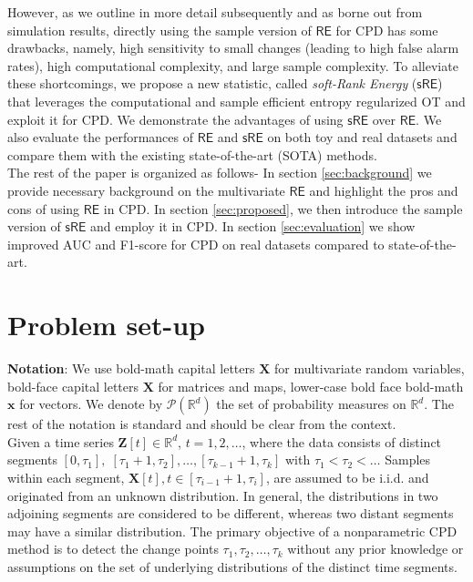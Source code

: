 \documentclass{article}
\begin{document}
However, as we outline in more detail subsequently and as borne out from simulation results, directly using the sample version of {\small $\mathsf{RE}$} for CPD has some drawbacks, namely, high sensitivity to small changes (leading to high false alarm rates), high computational complexity, and large sample complexity. To alleviate these  shortcomings, we propose a new statistic, called \textit{soft-Rank Energy} ({\small $\mathsf{sRE}$}) that leverages the computational and sample efficient entropy regularized OT \cite{peyre2019computational} and exploit it for CPD. We demonstrate the advantages of using {\small $\mathsf{sRE}$} over {\small $\mathsf{RE}$}. We also evaluate the performances of {\small $\mathsf{RE}$} and {\small $\mathsf{sRE}$} on both toy and real datasets and compare them with the existing state-of-the-art (SOTA) methods. \\ 

The rest of the paper is organized as follows- In section \ref{sec:background} we provide necessary background on the multivariate {\small $\mathsf{RE}$} and highlight the pros and cons of using {\small $\mathsf{RE}$} in CPD. In section \ref{sec:proposed}, we then introduce the sample version of {\small $\mathsf{sRE}$} and employ it in CPD. In section \ref{sec:evaluation} we show improved AUC and F1-score for CPD on real datasets compared to state-of-the-art.

\section{Problem set-up}

\textbf{Notation}: We use bold-math capital letters $\bm{X}$ for multivariate random variables, bold-face capital letters $\mathbf{X}$ for matrices and maps, lower-case bold face bold-math $\bm{x}$ for vectors. We denote by $\mathcal{P}(\mathbb{R}^d)$ the set of probability measures on $\mathbb{R}^d$. The rest of the notation is standard and should be clear from the context. \\
Given a time series $\bm Z[t] \in \mathbb R^d$, $t= 1, 2, \dots$, where the data consists of distinct segments  $[0,\! \tau_1], \!\; [\tau_1\! +\!1, \!\tau_2], \dots, [\tau_{k-1} + 1, \tau_{k}]$ with $\tau_1 < \tau_2 < \dots$ Samples within each segment, $\bm X[t], t\in[\tau_{i-1}+1, \tau_i]$, are assumed to be i.i.d. and originated from an unknown distribution. In general, the distributions in two adjoining segments are considered to be different, whereas two distant segments may have a similar distribution. The primary objective of a nonparametric CPD method is to detect the change points $\tau_1, \tau_2, \dots, \tau_k$ without any prior knowledge or assumptions on the set of underlying distributions of the distinct time segments.
\end{document}
